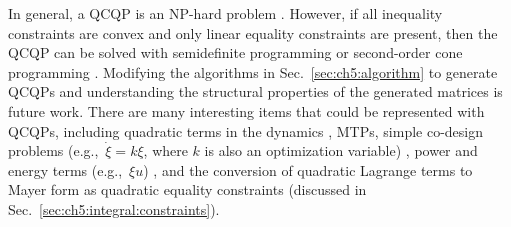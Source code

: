 \noindent In general, a QCQP is an NP-hard problem \cite{So2011a}.
However, if all inequality constraints are convex and only linear equality constraints are present, then the QCQP can be solved with semidefinite programming or second-order cone programming \cite{Boyd2009a}.
Modifying the algorithms in Sec.~\ref{sec:ch5:algorithm} to generate QCQPs and understanding the structural properties of the generated matrices is future work. 
There are many interesting items that could be represented with QCQPs, including quadratic terms in the dynamics \cite{Sun2016a}, MTPs, simple co-design problems (e.g.,~$\dot{\xi} = k \xi$, where $k$ is also an optimization variable) \cite{Herber2017b}, power and energy terms (e.g.,~$\xi u$) \cite{Herber2014a, Faedo2017a}, and the conversion of quadratic Lagrange terms to Mayer form as quadratic equality constraints (discussed in Sec.~\ref{sec:ch5:integral:constraints}).